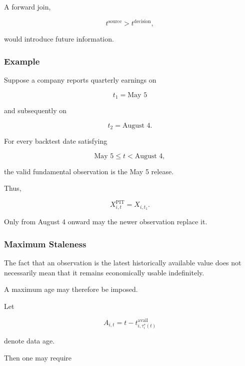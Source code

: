 \documentclass[11pt,a4paper]{article}
\begin{document}
A forward join,

\begin{equation}
t^{\mathrm{source}}
>
t^{\mathrm{decision}},
\end{equation}

would introduce future information.


\subsubsection{Example}

Suppose a company reports quarterly earnings on

\begin{equation}
t_1=\text{May 5}
\end{equation}

and subsequently on

\begin{equation}
t_2=\text{August 4}.
\end{equation}

For every backtest date satisfying

\begin{equation}
\text{May 5}
\leq
t
<
\text{August 4},
\end{equation}

the valid fundamental observation is the May 5 release.

Thus,

\begin{equation}
X_{i,t}^{\mathrm{PIT}}
=
X_{i,t_1}.
\end{equation}

Only from August 4 onward may the newer observation replace it.


\subsubsection{Maximum Staleness}

The fact that an observation is the latest historically available value does
not necessarily mean that it remains economically usable indefinitely.

A maximum age may therefore be imposed.

Let

\begin{equation}
A_{i,t}
=
t
-
t_{i,\tau_i^*(t)}^{\mathrm{avail}}
\end{equation}

denote data age.

Then one may require
\end{document}

